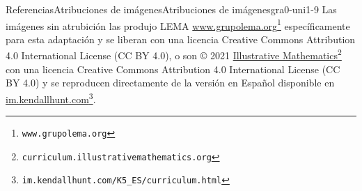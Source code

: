 %
\typeout{************************************************}
\typeout{************************************************}
%
\clearpage
\begin{references-section}{Referencias}{Atribuciones de imágenes}{}{Atribuciones de imágenes}{}{}{gra0-uni1-9}
Las imágenes sin atrubición las produjo LEMA \href{https://www.grupolema.org}{www.grupolema.org}\footnote{\nolinkurl{www.grupolema.org}\label{gra0-uni1-9-2-2}} específicamente para esta adaptación y se liberan con una licencia Creative Commons Attribution 4.0 International License (CC BY 4.0), o son © 2021 \href{https://curriculum.illustrativemathematics.org}{Illustrative Mathematics}\footnote{\nolinkurl{curriculum.illustrativemathematics.org}\label{gra0-uni1-9-2-4}} con una licencia Creative Commons Attribution 4.0 International License (CC BY 4.0) y se reproducen directamente de la versión en Español disponible en \href{https://im.kendallhunt.com/K5_ES/curriculum.html}{im.kendallhunt.com}\footnote{\nolinkurl{im.kendallhunt.com/K5_ES/curriculum.html}\label{gra0-uni1-9-2-6}}.%
\end{references-section}
%
%


